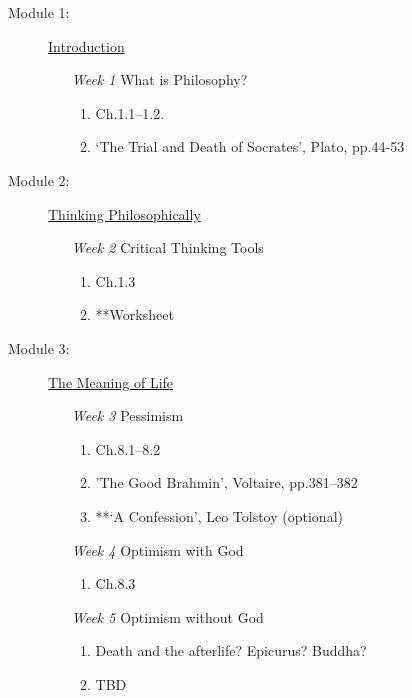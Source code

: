 \documentclass[article,oneside]{memoir}
\begin{document}
\begin{description}

\item[Module 1:] \href{http://scoconno.github.io/Teaching/Examined/Intro/}{Introduction}
\begin{enumerate}
\item[\textit{Week 1}] What is Philosophy?
\begin{enumerate}
\item Ch.1.1--1.2.
\item `The Trial and Death of Socrates', Plato, pp.44-53
\end{enumerate}
\end{enumerate}

\item[Module 2:] \href{http://scoconno.github.io/Teaching/Examined/CT/}{Thinking Philosophically}
\begin{enumerate}
\item[\textit{Week 2}] Critical Thinking Tools 
\begin{enumerate}
\item Ch.1.3
\item **Worksheet
\end{enumerate}
\end{enumerate}

\item[Module 3:] \href{http://scoconno.github.io/Teaching/Examined/Meaning/}{The Meaning of Life}

\begin{enumerate}
\item[\textit{Week 3}] Pessimism 
\begin{enumerate}
\item Ch.8.1--8.2 
\item 'The Good Brahmin', Voltaire, pp.381--382
\item **`A Confession', Leo Tolstoy (optional)
\end{enumerate}

\item[\textit{Week 4}] Optimism with God
\begin{enumerate}
\item Ch.8.3
\end{enumerate}

\item[\textit{Week 5}] Optimism without God
\begin{enumerate}
\item Death and the afterlife? Epicurus? Buddha? 
\item TBD
\end{enumerate}
\end{enumerate}



\end{description}
\end{document}
